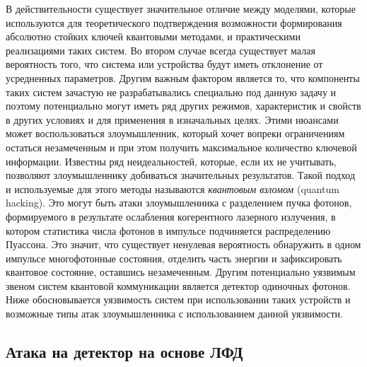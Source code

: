 В действительности существует значительное отличие между моделями, которые используются для теоретического подтверждения возможности формирования абсолютно стойких ключей квантовыми методами, и практическими реализациями таких систем. Во втором случае всегда существует малая вероятность того, что система или устройства будут иметь отклонение от усредненных параметров. Другим важным фактором является то, что компоненты таких систем зачастую не разрабатывались специально под данную задачу и поэтому потенциально могут иметь ряд других режимов, характеристик и свойств в других условиях и для применения в изначальных целях. Этими нюансами может воспользоваться злоумышленник, который хочет вопреки ограничениям остаться незамеченным и при этом получить максимальное количество ключевой информации. Известны ряд неидеальностей, которые, если их не учитывать, позволяют злоумышленнику добиваться значительных результатов. Такой подход и используемые для этого методы называются \textit{квантовым взломом} (quantum hacking). Это могут быть атаки злоумышленника с разделением пучка фотонов, формируемого в результате ослабления когерентного лазерного излучения, в котором статистика числа фотонов в импульсе подчиняется распределению Пуассона. Это значит, что существует ненулевая вероятность обнаружить в одном импульсе многофотонные состояния, отделить часть энергии и зафиксировать квантовое состояние, оставшись незамеченным. Другим потенциально уязвимым звеном систем квантовой коммуникации является детектор одиночных фотонов. Ниже обосновывается уязвимость систем при использовании таких устройств и возможные типы атак злоумышленника с использованием данной уязвимости. 







\subsection{Атака на детектор на основе ЛФД} \label{subsec:ch1/sec6/sub4}

